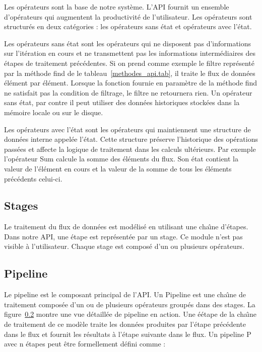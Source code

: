 Les op\'erateurs sont la base de notre syst\`eme. L'API fournit un ensemble d'op\'erateurs qui augmentent la productivit\'e de l'utilisateur. Les op\'erateurs sont structur\'es en deux cat\'egories : les op\'erateurs sans \'etat et op\'erateurs avec l'\'etat.

Les op\'erateurs sans \'etat sont les op\'erateurs qui ne disposent pas d'informations sur l'it\'eration en cours et ne transmettent pas les informations interm\'ediaires des \'etapes de traitement pr\'ec\'edentes. Si on prend comme exemple le filtre repr\'esent\'e par la m\'ethode find de le tableau~\ref{methodes_api.tab}, il traite le flux de donn\'ees \'el\'ement par \'el\'ement. Lorsque la fonction fournie en param\`etre de la m\'ethode find ne satisfait pas la condition de filtrage, le filtre ne retournera rien. Un op\'erateur sans \'etat, par contre il peut utiliser des donn\'ees historiques stock\'ees dans la m\'emoire locale ou sur le disque.

Les op\'erateurs avec l'\'etat sont les op\'erateurs qui maintiennent une structure de donn\'ees interne appel\'ee l'\'etat. Cette structure pr\'eserve l'historique des op\'erations pass\'ees et affecte la logique de traitement dans les calculs ult\'erieurs. Par exemple l'op\'erateur Sum calcule la somme des \'el\'ements du flux. Son \'etat contient la valeur de l'\'el\'ement en cours et la valeur de la somme de tous les \'el\'ements pr\'ec\'edents celui-ci. 



\subsection{Stages}

Le traitement du flux de donn\'ees est mod\'elis\'e en utilisant une cha\^{\i}ne d'\'etapes. Dans notre API, une \'etape est repr\'esent\'ee par un stage. Ce module n'est pas visible \`a l'utilisateur. Chaque stage est compos\'e d'un ou plusieurs op\'erateurs. 


\subsection{Pipeline}

Le pipeline est le composant principal de l'API. Un Pipeline est une cha\^{\i}ne de traitement compos\'ee d'un ou de plusieurs op\'erateurs group\'es dans des stages. La figure~\ref{} montre une vue d\'etaill\'ee de pipeline en action. Une \'eétape de la cha\^{\i}ne de traitement de ce mod\`ele traite les donn\'ees produites par l'\'etape pr\'ec\'edente dans le flux et fournit les r\'esultats \`a l'étape suivante dans le flux. Un pipeline P avec n \'etapes peut \^etre formellement d\'efini comme :


